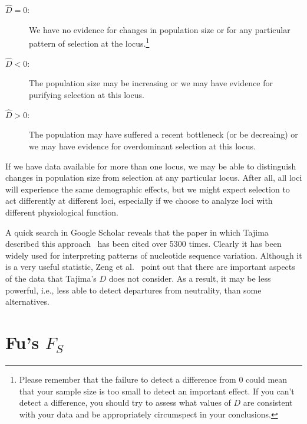 \begin{description}

\item[$\hat D = 0$:] We have no evidence for changes in population
  size or for any particular pattern of selection at the
  locus.\footnote{Please remember that the failure to detect a difference
    from 0 could mean that your sample size is too small to detect an
    important effect. If you can't detect a difference, you should try
    to assess what values of $D$ are consistent with your data and be
    appropriately circumspect in your conclusions.}

\item[$\hat D < 0$:] The population size may be increasing or we may
  have evidence for purifying selection at this locus.

\item[$\hat D > 0$:] The population may have suffered a recent
  bottleneck (or be decreaing) or we may have evidence for
  overdominant selection at this locus.

\end{description}

\noindent If we have data available for more than one locus, we may be
able to distinguish changes in population size from selection at any
particular locus. After all, all loci will experience the same
demographic effects, but we might expect selection to act differently
at different loci, especially if we choose to analyze loci with
different physiological function.

A quick search in Google Scholar reveals that the paper in which
Tajima described this approach~\cite{Tajima89} has been cited over
5300 times. Clearly it has been widely used for interpreting patterns
of nucleotide sequence variation. Although it is a very useful
statistic, Zeng et al.~\cite{Zeng-etal-2006} point out that there are
important aspects of the data that Tajima's $D$ does not consider. As
a result, it may be less powerful, i.e., less able to detect
departures from neutrality, than some alternatives.

\section*{Fu's $F_S$}

